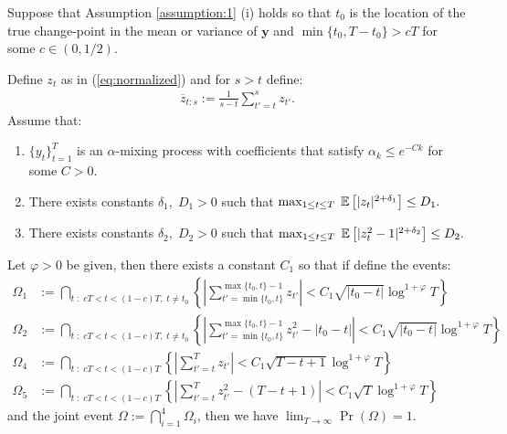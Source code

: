 \begin{lemma}\label{lemma:thm3-event-bound}
Suppose that Assumption \ref{assumption:1} (i) holds so that $t_0$ is the location of the true change-point in the mean or variance of $\mathbf{y}$ and $\min\{t_0,T-t_0\} > cT$ for some $c \in (0,1/2)$.

Define $z_t$ as in (\ref{eq:normalized}) and for $s> t$ define: 
\begin{align*}
    \overline{z}_{t:s} := \frac{1}{s - t} \sum_{t'=t}^s z_{t'}.
\end{align*}
Assume that:
\begin{enumerate}[label=(\roman*)]
    \item $\{y_t\}_{t=1}^T$ is an $\alpha$-mixing process with coefficients that satisfy $\alpha_k \leq e^{-Ck}$ for some $C > 0$.
    \item There exists constants $\delta_1, \; D_1 > 0$ such that $\max_{1\leq t \leq T}\; \mathbb{E}\left[|z_t|^{2+\delta_1}\right]\leq D_1.$ 
    \item There exists constants $\delta_2, \; D_2 > 0$ such that $\max_{1\leq t \leq T}\; \mathbb{E}\left[|z_t^2 - 1|^{2+\delta_2}\right]\leq D_2.$ 
\end{enumerate}
Let $\varphi > 0$ be given, then there exists a constant $C_1$ so that if define the events:
\begin{align*}
    \Omega_1 &:= \bigcap_{t \;:\; cT < t < (1-c)T,\; t \neq t_0} \left\{\left|\sum_{t'=\min\{t_0,t\}}^{\max\{t_0,t\}-1} z_{t'}\right| < C_1\sqrt{|t_0-t|}\log^{1+\varphi} T \right\} \\
    \Omega_2 &:=  \bigcap_{t \;:\; cT < t < (1-c)T,\; t \neq t_0}  \left\{\left|\sum_{t'=\min\{t_0,t\}}^{\max\{t_0,t\}-1} z_{t'}^2 - |t_0-t| \right| < C_1\sqrt{|t_0 -t|}\log^{1+\varphi} T \right\} \\
    \Omega_4 &:=  \bigcap_{t \;:\; cT < t < (1-c)T }  \left\{\left|\sum_{t'=t}^{T} z_{t'}\right| < C_1\sqrt{T-t+1}\log^{1+\varphi} T \right\} \\
    \Omega_5 &:=  \bigcap_{t \;:\; cT < t < (1-c)T }  \left\{\left|\sum_{t'=t}^{T} z_{t'}^2 - (T-t+1) \right| < C_1\sqrt{T}\log^{1+\varphi} T \right\}
\end{align*} 
and the joint event $\Omega := \bigcap_{i=1}^4 \Omega_i $, then we have $\lim_{T\to\infty} \Pr(\Omega) = 1$. 


\end{lemma}

